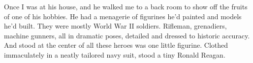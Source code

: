 \documentclass[12pt, oneside]{memoir}
\begin{document}
Once I was at his house, and he walked me to a back room to show off
the fruits of one of his hobbies.
He had a menagerie of figurines he'd painted and models he'd built.
They were mostly World War II soldiers.
Rifleman, grenadiers, machine gunners, all in dramatic poses, detailed
and dressed to historic accuracy.
And stood at the center of all these heroes was one little figurine.
Clothed immaculately in a neatly tailored navy suit, stood a
tiny Ronald Reagan.

\end{document}
